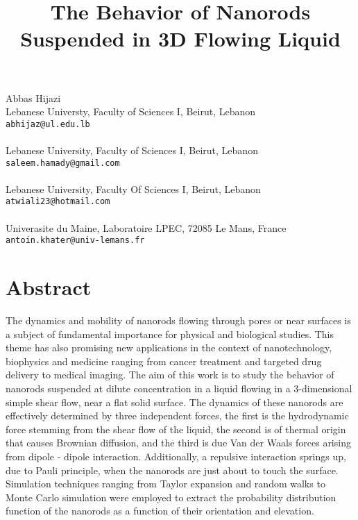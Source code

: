 \title{The Behavior of Nanorods Suspended in 3D Flowing Liquid}
 \author{} \institute{}
\maketitle
\begin{center}
{\large Abbas Hijazi}\\
Lebanese Universty, Faculty of Sciences I, Beirut, Lebanon\\
{\tt abhijaz@ul.edu.lb}
\\ \vspace{4mm}{\large Saleem Hamady}\\
Lebanese University, Faculty of Sciences I, Beirut, Lebanon\\
{\tt saleem.hamady@gmail.com}
\\ \vspace{4mm}{\large Ali Atwi}\\
Lebanese University, Faculty Of Sciences I, Beirut, Lebanon\\
{\tt atwiali23@hotmail.com}
\\ \vspace{4mm}{\large Antoine Khater}\\
Univerasite du Maine, Laboratoire LPEC, 72085 Le Mans, France\\
{\tt antoin.khater@univ-lemans.fr}

\end{center}

\section*{Abstract}

The dynamics and mobility of nanorods flowing through pores or near surfaces is a subject of fundamental importance for physical and biological studies. This theme has also promising new applications in the context of nanotechnology, biophysics and medicine ranging from cancer treatment and targeted drug delivery to medical imaging. 
	The aim of this work is to study the behavior of nanorods suspended at dilute concentration in a liquid flowing in a 3-dimensional simple shear flow, near a flat solid surface. The dynamics of these nanorods are effectively determined by three independent forces, the first is the hydrodynamic force stemming from the shear flow of the liquid, the second is of thermal origin that causes Brownian diffusion, and the third is due Van der Waals forces arising from dipole - dipole interaction. Additionally, a repulsive interaction springs up, due to Pauli principle, when the nanorods are just about to touch the surface.
	Simulation techniques ranging from Taylor expansion and random walks to Monte Carlo simulation were employed to extract the probability distribution function of the nanorods as a function of their orientation and elevation.



